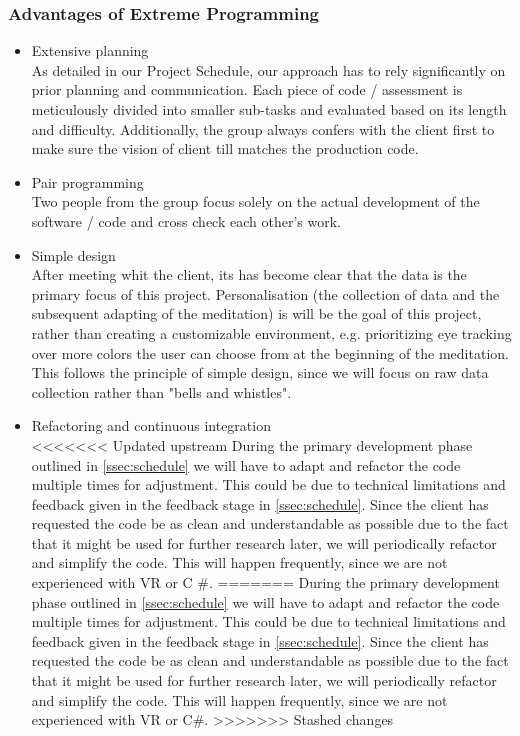 \documentclass[coverpage,lineno]{../custom}
\begin{document}
\subsubsection{Advantages of Extreme Programming}
\begin{itemize}
    \item Extensive planning \\
    As detailed in our Project Schedule, our approach has to rely significantly on prior planning and communication. Each piece of code / assessment is meticulously divided into smaller sub-tasks and evaluated based on its length and difficulty. Additionally, the group always confers with the client first to make sure the vision of client till matches the production code.
    \item Pair programming \\
    Two people from the group focus solely on the actual development of the software / code and cross check each other's work. 
    \item Simple design \\
    After meeting whit the client, its has become clear that the data is the primary focus of this project. Personalisation (the collection of data and the subsequent adapting of the meditation) is will be the goal of this project, rather than creating a customizable environment, e.g. prioritizing eye tracking over more colors the user can choose from at the beginning of the meditation. This follows the principle of simple design, since we will focus on raw data collection rather than "bells and whistles".
    \item Refactoring and continuous integration \\
<<<<<<< Updated upstream
     During the primary development phase outlined in \cref{ssec:schedule} we will have to adapt and refactor the code multiple times for adjustment. This could be due to technical limitations and feedback given in the feedback stage in \cref{ssec:schedule}. Since the client has requested the code be as clean and understandable as possible due to the fact that it might be used for further research later, we will periodically refactor and simplify the code. This will happen frequently, since we are not experienced with VR or C \#.
=======
     During the primary development phase outlined in \cref{ssec:schedule} we will have to adapt and refactor the code multiple times for adjustment. This could be due to technical limitations and feedback given in the feedback stage in \cref{ssec:schedule}. Since the client has requested the code be as clean and understandable as possible due to the fact that it might be used for further research later, we will periodically refactor and simplify the code. This will happen frequently, since we are not experienced with VR or C\#.
>>>>>>> Stashed changes
\end{itemize}
\end{document}
